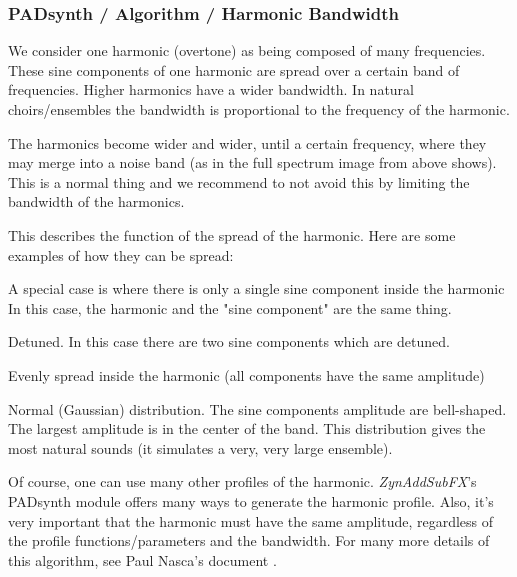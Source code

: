 \subsubsection{PADsynth / Algorithm / Harmonic Bandwidth}
\label{subsubsec:padsynth_algorithm_harmonic_bandwidth}

   We consider one harmonic (overtone) as being composed of many frequencies.
   These sine components of one harmonic are spread over a certain band of
   frequencies.  Higher harmonics have a wider bandwidth. In natural
   choirs/ensembles the bandwidth is proportional to the frequency of the
   harmonic.
   
%

   The harmonics become wider and wider, until a certain frequency, where
   they may merge into a noise band (as in the full spectrum image from above
   shows). This is a normal thing and we recommend to not avoid this by
   limiting the bandwidth of the harmonics.


   This describes the function of the spread of the harmonic.
   Here are some examples of how they can be spread:

   \begin{enumber}
      \item  A special case is where there is only a single sine component
         inside the harmonic In this case, the harmonic and the "sine
         component" are the same thing.
      \item  Detuned. In this case there are two sine components which are
         detuned.
      \item  Evenly spread inside the harmonic (all components have the same
         amplitude)
      \item  Normal (Gaussian) distribution. The sine components amplitude are
         bell-shaped. The largest amplitude is in the center of the band. This
         distribution gives the most natural sounds (it simulates a very, very
         large ensemble).
   \end{enumber}

   Of course, one can use many other profiles of the harmonic.
   \textsl{ZynAddSubFX}'s PADsynth module offers many ways to generate the
   harmonic profile.  Also, it's very important that the harmonic must have the
   same amplitude, regardless of the profile functions/parameters and the
   bandwidth.
   For many more details of this algorithm, see Paul Nasca's document
   \cite{zyndoc}.

